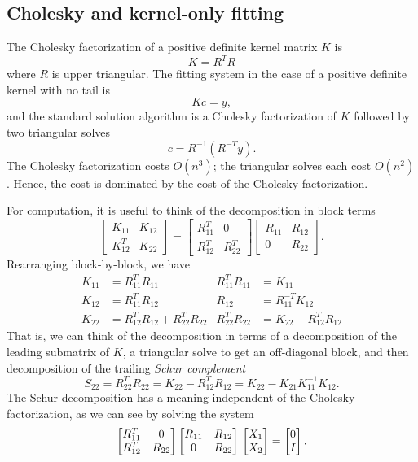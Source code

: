 \documentclass[12pt, leqno]{article} %
\begin{document}
\subsection{Cholesky and kernel-only fitting}

The Cholesky factorization of a positive definite kernel matrix $K$ is
\[
  K = R^T R
\]
where $R$ is upper triangular.  The fitting system in the case of a
positive definite kernel with no tail is
\[
  Kc = y,
\]
and the standard solution algorithm is a Cholesky factorization of $K$
followed by two triangular solves
\[
  c = R^{-1} (R^{-T} y).
\]
The Cholesky factorization costs $O(n^3)$; the triangular solves each
cost $O(n^2)$.  Hence, the cost is dominated by the cost of the
Cholesky factorization.

For computation, it is useful to think of the decomposition in block terms
\[
  \begin{bmatrix} K_{11} & K_{12} \\ K_{12}^T & K_{22} \end{bmatrix} =
  \begin{bmatrix} R_{11}^T & 0 \\ R_{12}^T & R_{22}^T \end{bmatrix}
  \begin{bmatrix} R_{11} & R_{12} \\ 0 & R_{22} \end{bmatrix}.
\]
Rearranging block-by-block, we have
\begin{align*}
  K_{11} &= R_{11}^T R_{11} &
  R_{11}^T R_{11} &= K_{11} \\
  K_{12} &= R_{11}^T R_{12} &
  R_{12} &= R_{11}^{-T} K_{12} \\
  K_{22} &= R_{12}^T R_{12} + R_{22}^T R_{22} &
  R_{22}^T R_{22} &= K_{22} - R_{12}^T R_{12}
\end{align*}
That is, we can think of the decomposition in terms of a decomposition
of the leading submatrix of $K$, a triangular solve to get an
off-diagonal block, and then decomposition of the trailing {\em Schur
  complement}
\[
  S_{22} = R_{22}^T R_{22} = K_{22} - R_{12}^T R_{12} = K_{22} - K_{21} K_{11}^{-1} K_{12}.
\]
The Schur decomposition has a meaning independent of the Cholesky
factorization, as we can see by solving the system
\[
  \begin{bmatrix} R_{11}^T & 0 \\ R_{12}^T & R_{22} \end{bmatrix}
  \begin{bmatrix} R_{11} & R_{12} \\ 0 & R_{22} \end{bmatrix} \\
  \begin{bmatrix} X_1 \\ X_2 \end{bmatrix} =
  \begin{bmatrix} 0 \\ I \end{bmatrix}.
\]
\end{document}
